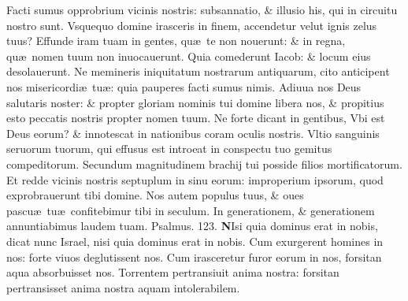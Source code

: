 \documentclass[a5paper,10pt]{book}
\def\ae{æ}
\begin{document}
\begin{multicols*}{2}
\newline \color{red} F\color{black}acti sumus opprobrium vicinis nostris: subsannatio, \& illusio his, qui in circuitu nostro sunt.
\newline \color{red} V\color{black}squequo domine irasceris in finem, accendetur velut ignis zelus tuus?
\newline \color{red} E\color{black}ffunde iram tuam in gentes, qu\ae \ te non nouerunt: \& in regna, qu\ae \ nomen tuum non inuocauerunt.
\newline \color{red} Q\color{black}uia comederunt Iacob: \& locum eius desolauerunt.
\newline \color{red} N\color{black}e memineris iniquitatum nostrarum antiquarum, cito anticipent nos misericordi\ae \ tu\ae : quia pauperes facti sumus nimis.
\newline \color{red} A\color{black}diuua nos Deus salutaris noster: \& propter gloriam nominis tui domine libera nos, \& propitius esto peccatis nostris propter nomen tuum.
\newline \color{red} N\color{black}e forte dicant in gentibus, Vbi est Deus eorum? \& innotescat in nationibus coram oculis nostris.
\newline \color{red} V\color{black}ltio sanguinis seruorum tuorum, qui effusus est introeat in conspectu tuo gemitus compeditorum.
\newline \color{red} S\color{black}ecundum magnitudinem brachij tui posside filios mortificatorum.
\newline \color{red} E\color{black}t redde vicinis nostris septuplum in sinu eorum: improperium ipsorum, quod exprobrauerunt tibi domine.
\newline \color{red} N\color{black}os autem populus tuus, \& oues pascu\ae \ tu\ae \ confitebimur tibi in seculum.
\newline \color{red} I\color{black}n generationem, \& generationem annuntiabimus laudem tuam.
\newline \color{red} Psalmus. \hypertarget{ps123}{123.} \color{black}
\lettrine[lines=2]{\bfseries \color{red} N}{}Isi quia dominus erat in nobis, dicat nunc Israel, nisi quia dominus erat in nobis.
\newline \color{red} C\color{black}um exurgerent homines in nos: forte viuos deglutissent nos.
\newline \color{red} C\color{black}um irasceretur furor eorum in nos, forsitan aqua absorbuisset nos.
\newline \color{red} T\color{black}orrentem pertransiuit anima nostra: forsitan pertransisset anima nostra aquam intolerabilem.

\end{multicols*}
\end{document}
